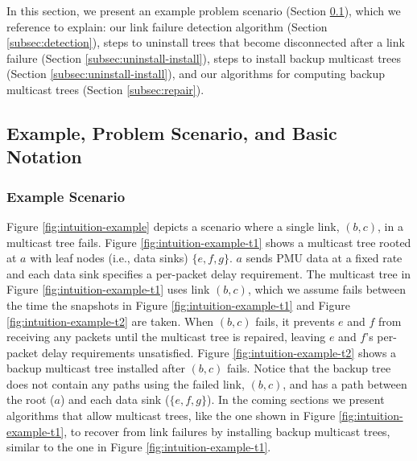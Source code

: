 In this section, we present an example problem scenario (Section \ref{subsec:scenario}), which we reference to explain: our link failure detection algorithm (Section \ref{subsec:detection}),
steps to uninstall trees that become disconnected after a link failure (Section \ref{subsec:uninstall-install}), steps to install backup multicast trees (Section \ref{subsec:uninstall-install}),
and our algorithms for computing backup multicast trees (Section \ref{subsec:repair}).






\subsection{Example, Problem Scenario, and Basic Notation}
\label{subsec:scenario}

\subsubsection{Example Scenario}

Figure \ref{fig:intuition-example} depicts a scenario where a single link, $(b,c)$, in a multicast tree fails.  %
Figure \ref{fig:intuition-example-t1} shows a multicast tree rooted at $a$ with leaf nodes (i.e., data sinks) $\{e,f,g\}$.  $a$ sends PMU data at a fixed rate and each data sink specifies a per-packet delay requirement. 
The multicast tree in Figure \ref{fig:intuition-example-t1} uses link $(b,c)$, which  we assume fails between the time the snapshots in Figure \ref{fig:intuition-example-t1} and Figure \ref{fig:intuition-example-t2} are taken.
When $(b,c)$ fails, it prevents $e$ and $f$ from receiving any packets until the multicast tree is repaired, leaving $e$ and $f$'s per-packet delay requirements unsatisfied. 
Figure \ref{fig:intuition-example-t2} shows a backup multicast tree installed after $(b,c)$ fails.  Notice that the backup tree does not contain any paths using the failed link, $(b,c)$, and has a path between the root ($a$) and each data sink ($\{e,f,g\}$).  
In the coming sections we present algorithms that allow multicast trees, like the one shown in Figure \ref{fig:intuition-example-t1}, to recover from link failures by installing backup multicast trees, similar to the one in Figure \ref{fig:intuition-example-t1}.

